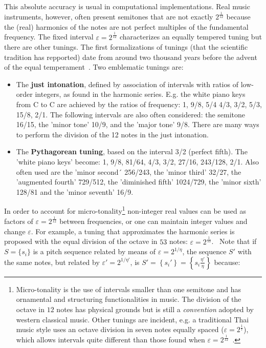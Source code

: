 This absolute accuracy is usual in computational implementations. Real music instruments, however, often present semitones that are not exactly $2^{\frac{1}{12}}$ because the (real) harmonics of the notes are not perfect multiples of the fundamental frequency. The fixed interval $\varepsilon=2^{\frac{1}{12}}$ characterizes an equally tempered tuning but there are other tunings. The first formalizations of tunings (that the scientific tradition has repported) date from around two thousand years before the advent of the equal temperament~\cite{Roederer}.
Two emblematic tunings are:
\begin{itemize}
    \item The {\bf just intonation}, defined by association of intervals with ratios of low-order integers, as found in the harmonic series. E.g. the white piano keys from C to C are achieved by the ratios of frequency: 1, 9/8, 5/4
    4/3, 3/2, 5/3, 15/8, 2/1. The following intervals are also often considered: the semitone 16/15, the 'minor tone' 10/9, and the 'major tone' 9/8. There are many ways to perform the division of the 12 notes in the just intonation.
    \item The {\bf Pythagorean tuning}, based on the interval 3/2 (perfect fifth). The 'white piano keys' become: 1, 9/8, 81/64, 4/3, 3/2, 27/16, 243/128, 2/1. Also often used are the 'minor second´ 256/243, the 'minor third' 32/27, the 'augmented fourth' 729/512, the 'diminished fifth' 1024/729, the 'minor sixth' 128/81 and the 'minor seventh' 16/9. 
\end{itemize}

In order to account for micro-tonality\footnote{Micro-tonality is the use of intervals smaller
than one semitone and has ornamental and structuring functionalities in music. The division of the octave in $12$ notes has physical grounds but is still a \emph{convention} adopted by western classical music. Other tunings are incident, e.g. a traditional Thai music style uses an octave division in seven notes equally spaced ($\varepsilon=2^{\frac{1}{7}}$),
which allows intervals quite different than those found when $\varepsilon=2^{\frac{1}{12}}$~\cite{Wisnick}.} non-integer real values can be used as factors of $\varepsilon=2^{\frac{1}{12}}$ between frequencies, or one can maintain integer values and change $\varepsilon$. For example, a tuning that approximates the harmonic series
is proposed with the equal division of the octave in $53$ notes:
$\varepsilon=2^{\frac{1}{53}}$.~\cite{microtonalidade}
Note that if $S=\{s_i\}$ is a pitch sequence related by means of $\varepsilon=2^{1/\eta}$, the sequence $S'$ with the same notes, but related by $\varepsilon'=2^{1/\eta'}$, is 
$S'=\left\{s_i'\right\}=\left\{
s_i \frac{\eta'}{\eta}\right\}$ because:

